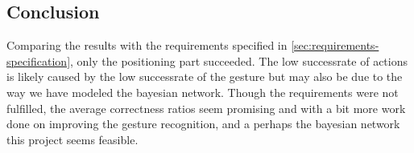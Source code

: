 \subsection{Conclusion}
\label{sec:evaluation:user-tests-conclusion}

Comparing the results with the requirements specified in \cref{sec:requirements-specification}, only the positioning part succeeded.
The low successrate of actions is likely caused by the low successrate of the gesture but may also be due to the way we have modeled the bayesian network.
Though the requirements were not fulfilled, the average correctness ratios seem promising and with a bit more work done on improving the gesture recognition, and a perhaps the bayesian network this project seems feasible.

